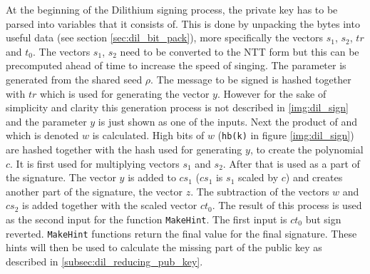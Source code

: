 At the beginning of the Dilithium signing process, the private key has to be parsed into variables that it consists of. This is done by unpacking the bytes into useful data (see section \ref{sec:dil_bit_pack}), more specifically the vectors $s_1$, $s_2$, $tr$ and $t_0$. The vectors $s_1$, $s_2$ need to be converted to the NTT form but this can be precomputed ahead of time to increase the speed of singing. The parameter  is generated from the shared seed $\rho$. The message to be signed is hashed together with $tr$ which is used for generating the vector $y$. However for the sake of simplicity and clarity this generation process is not described in \ref{img:dil_sign} and the parameter $y$ is just shown as one of the inputs. Next the product of  and  which is denoted $w$ is calculated. High bits of $w$ (\texttt{hb(k)} in figure \ref{img:dil_sign}) are hashed together with the hash used for generating $y$, to create the polynomial $c$. It is first used for multiplying vectors $s_1$ and $s_2$. After that is used as a part of the signature. The vector $y$ is added to $cs_1$ ($cs_1$ is $s_1$ scaled by $c$) and creates another part of the signature, the vector $z$. The subtraction of the vectors $w$ and $cs_2$ is added together with the scaled vector $ct_0$. The result of this process is used as the second input for the function \texttt{MakeHint}. The first input is $ct_0$ but sign reverted. \texttt{MakeHint} functions return the final value for the final signature. These hints will then be used to calculate the missing part of the public key as described in \ref{subsec:dil_reducing_pub_key}.
